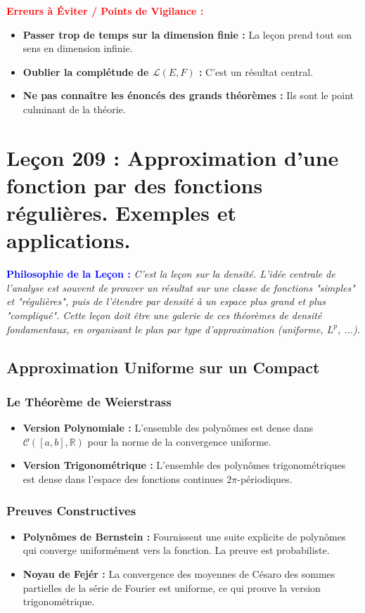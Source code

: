 \documentclass[12pt, a4paper, parskip=full]{report}
\theoremstyle{agregstyle}
\newenvironment{philosophie}
  {\par\medskip\noindent\begin{oframed}\noindent\textbf{\textcolor{blue}{Philosophie de la Leçon :}}\itshape}
  {\end{oframed}\par\medskip}
\newenvironment{erreurs}
  {\par\medskip\noindent\begin{oframed}\noindent\textbf{\textcolor{red}{Erreurs à Éviter / Points de Vigilance :}}}
  {\end{oframed}\par\medskip}
\begin{document}
\begin{erreurs}
    \begin{itemize}
        \item \textbf{Passer trop de temps sur la dimension finie :} La leçon prend tout son sens en dimension infinie.
        \item \textbf{Oublier la complétude de $\mathcal{L}(E,F)$ :} C'est un résultat central.
        \item \textbf{Ne pas connaître les énoncés des grands théorèmes :} Ils sont le point culminant de la théorie.
    \end{itemize}
\end{erreurs}
\chapter{Leçon 209 : Approximation d'une fonction par des fonctions régulières. Exemples et applications.}

\begin{philosophie}
    C'est la leçon sur la densité. L'idée centrale de l'analyse est souvent de prouver un résultat sur une classe de fonctions "simples" et "régulières", puis de l'étendre par densité à un espace plus grand et plus "compliqué". Cette leçon doit être une galerie de ces théorèmes de densité fondamentaux, en organisant le plan par type d'approximation (uniforme, $L^p$, ...).
\end{philosophie}

\section{Approximation Uniforme sur un Compact}
\subsection{Le Théorème de Weierstrass}
\begin{itemize}
    \item \textbf{Version Polynomiale :} L'ensemble des polynômes est dense dans $\mathcal{C}([a,b], \mathbb{R})$ pour la norme de la convergence uniforme.
    \item \textbf{Version Trigonométrique :} L'ensemble des polynômes trigonométriques est dense dans l'espace des fonctions continues $2\pi$-périodiques.
\end{itemize}
\subsection{Preuves Constructives}
\begin{itemize}
    \item \textbf{Polynômes de Bernstein :} Fournissent une suite explicite de polynômes qui converge uniformément vers la fonction. La preuve est probabiliste.
    \item \textbf{Noyau de Fejér :} La convergence des moyennes de Césaro des sommes partielles de la série de Fourier est uniforme, ce qui prouve la version trigonométrique.
\end{itemize}
\end{document}
